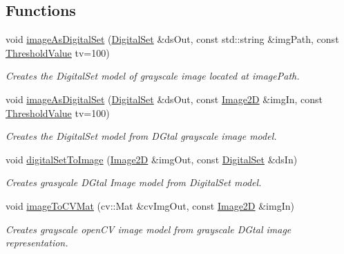 \subsection*{Functions}
\begin{DoxyCompactItemize}
\item 
void \hyperlink{namespaceDIPaCUS_1_1Representation_a2b07e44f7c61b0a3b971cbda49aa0d88}{image\+As\+Digital\+Set} (\hyperlink{namespaceDIPaCUS_1_1Representation_a6eca0b4fa262f2d600f11d82ee10b5a6}{Digital\+Set} \&ds\+Out, const std\+::string \&img\+Path, const \hyperlink{namespaceDIPaCUS_1_1Representation_a85996f90f0c4186ddae15b4f372bf875}{Threshold\+Value} tv=100)
\begin{DoxyCompactList}\small\item\em Creates the Digital\+Set model of grayscale image located at image\+Path. \end{DoxyCompactList}\item 
void \hyperlink{namespaceDIPaCUS_1_1Representation_a7ec92a29e6c9a4b581c086f4be6185de}{image\+As\+Digital\+Set} (\hyperlink{namespaceDIPaCUS_1_1Representation_a6eca0b4fa262f2d600f11d82ee10b5a6}{Digital\+Set} \&ds\+Out, const \hyperlink{namespaceDIPaCUS_1_1Representation_ae97917e89f57298fda1626daad9f1733}{Image2D} \&img\+In, const \hyperlink{namespaceDIPaCUS_1_1Representation_a85996f90f0c4186ddae15b4f372bf875}{Threshold\+Value} tv=100)
\begin{DoxyCompactList}\small\item\em Creates the Digital\+Set model from D\+Gtal grayscale image model. \end{DoxyCompactList}\item 
void \hyperlink{namespaceDIPaCUS_1_1Representation_a41889947a0233ac7c4433140f2d8886a}{digital\+Set\+To\+Image} (\hyperlink{namespaceDIPaCUS_1_1Representation_ae97917e89f57298fda1626daad9f1733}{Image2D} \&img\+Out, const \hyperlink{namespaceDIPaCUS_1_1Representation_a6eca0b4fa262f2d600f11d82ee10b5a6}{Digital\+Set} \&ds\+In)
\begin{DoxyCompactList}\small\item\em Creates grasycale D\+Gtal Image model from Digital\+Set model. \end{DoxyCompactList}\item 
void \hyperlink{namespaceDIPaCUS_1_1Representation_a790f8a0a301e25de1fd7371e9b1ccada}{image\+To\+C\+V\+Mat} (cv\+::\+Mat \&cv\+Img\+Out, const \hyperlink{namespaceDIPaCUS_1_1Representation_ae97917e89f57298fda1626daad9f1733}{Image2D} \&img\+In)
\begin{DoxyCompactList}\small\item\em Creates grayscale open\+CV image model from grayscale D\+Gtal image representation. \end{DoxyCompactList}\item 

\end{DoxyCompactItemize}
